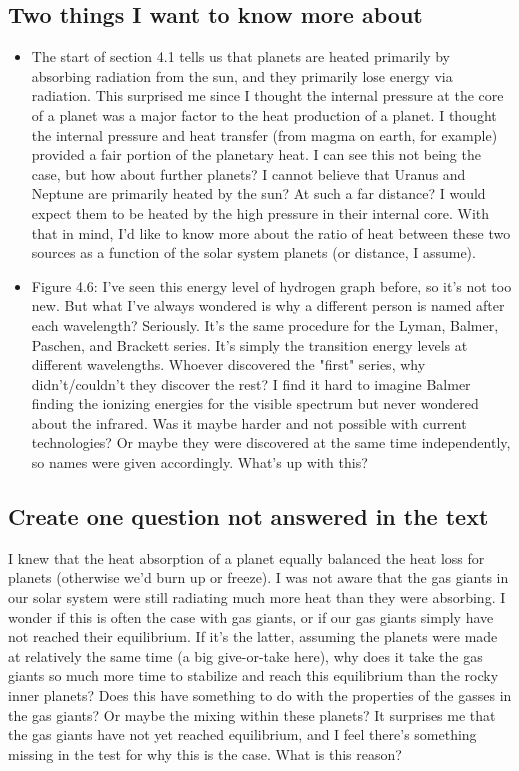 \documentclass[10pt]{article}
\begin{document}
	\subsection*{Two things I want to know more about}
	\begin{itemize}
		\item The start of section 4.1 tells us that planets are heated primarily by absorbing radiation from the sun, and they primarily lose energy via radiation. This surprised me since I thought the internal pressure at the core of a planet was a major factor to the heat production of a planet. I thought the internal pressure and heat transfer (from magma on earth, for example) provided a fair portion of the planetary heat. I can see this not being the case, but how about further planets? I cannot believe that Uranus and Neptune are primarily heated by the sun? At such a far distance? I would expect them to be heated by the high pressure in their internal core. With that in mind, I'd like to know more about the ratio of heat between these two sources as a function of the solar system planets (or distance, I assume). 
		
		\item Figure 4.6: I've seen this energy level of hydrogen graph before, so it's not too new. But what I've always wondered is why a different person is named after each wavelength? Seriously. It's the same procedure for the Lyman, Balmer, Paschen, and Brackett series. It's simply the transition energy levels at different wavelengths. Whoever discovered the "first" series, why didn't/couldn't they discover the rest? I find it hard to imagine Balmer finding the ionizing energies for the visible spectrum but never wondered about the infrared. Was it maybe harder and not possible with current technologies? Or maybe they were discovered at the same time independently, so names were given accordingly. What's up with this?
		
		
	\end{itemize}
	
	
	
	\subsection*{Create one question not answered in the text}
	I knew that the heat absorption of a planet equally balanced the heat loss for planets (otherwise we'd burn up or freeze). I was not aware that the gas giants in our solar system were still radiating much more heat than they were absorbing. I wonder if this is often the case with gas giants, or if our gas giants simply have not reached their equilibrium. If it's the latter, assuming the planets were made at relatively the same time (a big give-or-take here), why does it take the gas giants so much more time to stabilize and reach this equilibrium than the rocky inner planets? Does this have something to do with the properties of the gasses in the gas giants? Or maybe the mixing within these planets? It surprises me that the gas giants have not yet reached equilibrium, and I feel there's something missing in the test for why this is the case. What is this reason?
\end{document}
